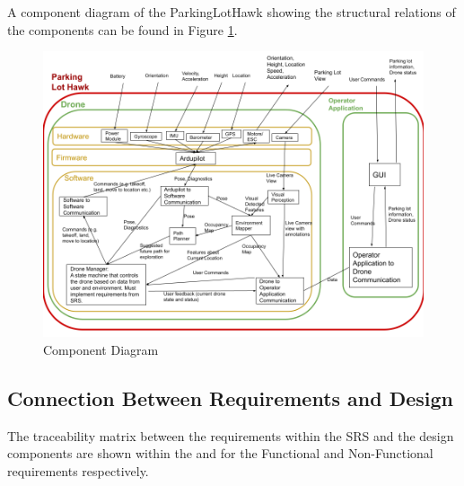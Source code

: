 \documentclass[12pt, titlepage]{article}
\begin{document}
A component diagram of the ParkingLotHawk showing the structural relations of the components can be found in Figure \ref{ComponentDiagram}.

\begin{figure}[h!]
  \begin{center} 
  \caption{Component Diagram}
  \label{ComponentDiagram}
        \includegraphics[width=1\textwidth]{ComponentDiagram.png}
  \end{center}
\end{figure}

\subsection{Connection Between Requirements and Design} \label{SecConnection}

The traceability matrix between the requirements within the SRS and the design components are shown within the  and  for the Functional and Non-Functional requirements respectively.
\end{document}
